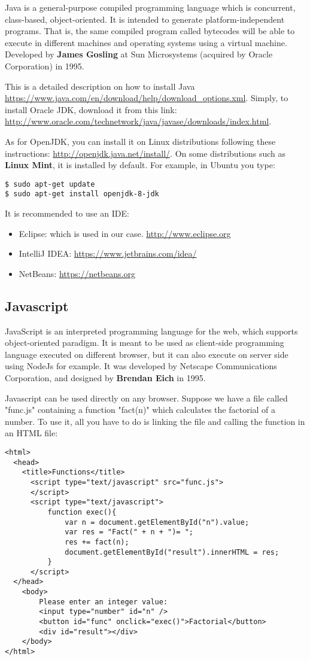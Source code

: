 \documentclass{KodeBook}
\begin{document}
Java is a general-purpose compiled programming language which is concurrent, class-based, object-oriented. 
It is intended to generate platform-independent programs. 
That is, the same compiled program called bytecodes will be able to execute in different machines and operating systems using a virtual machine. 
Developed by \textbf{James Gosling} at Sun Microsystems (acquired by Oracle Corporation) in 1995.

This is a detailed description on how to install Java \url{https://www.java.com/en/download/help/download_options.xml}.
Simply, to install Oracle JDK, download it from this link: \url{http://www.oracle.com/technetwork/java/javase/downloads/index.html}. 

As for OpenJDK, you can install it on Linux distributions following these instructions: \url{http://openjdk.java.net/install/}. 
On some distributions such as \textbf{Linux Mint}, it is installed by default.
For example, in Ubuntu you type:
\begin{lstlisting}[style=shellStyle]
$ sudo apt-get update
$ sudo apt-get install openjdk-8-jdk
\end{lstlisting}

It is recommended to use an IDE:
\begin{itemize}
	\item Eclipse: which is used in our case. \url{http://www.eclipse.org}
	\item IntelliJ IDEA: \url{https://www.jetbrains.com/idea/}
	\item NetBeans: \url{https://netbeans.org}
\end{itemize}

\subsection{Javascript}

JavaScript is an interpreted programming language for the web, which supports object-oriented paradigm. 
It is meant to be used as client-side programming language executed on different browser, but it can also execute on server side using NodeJs for example.
It was developed by Netscape Communications Corporation, and designed by \textbf{Brendan Eich} in 1995. 

Javascript can be used directly on any browser. 
Suppose we have a file called "func.js" containing a function "fact(n)" which calculates the factorial of a number. 
To use it, all you have to do is linking the file and calling the function in an HTML file:
\begin{lstlisting}[style=codeStyle]
<html>
  <head>
    <title>Functions</title>
      <script type="text/javascript" src="func.js">
      </script>
      <script type="text/javascript">
          function exec(){
              var n = document.getElementById("n").value;
              var res = "Fact(" + n + ")= ";
              res += fact(n);
              document.getElementById("result").innerHTML = res;
          }
      </script>
  </head>
    <body>
        Please enter an integer value: 
        <input type="number" id="n" />
        <button id="func" onclick="exec()">Factorial</button>
        <div id="result"></div>
    </body>
</html>
\end{lstlisting}
\end{document}
